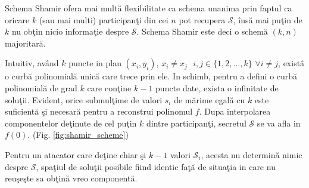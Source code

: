 \documentclass{llncs}
\begin{document}
Schema Shamir ofera mai mult\u{a} flexibilitate ca schema unanima prin faptul ca oricare $k$ (sau mai multi) participan\c{t}i
din cei $n$ pot recupera $\mathcal{S}$, \^{i}ns\u{a} mai pu\c{t}in de $k$ nu ob\c{t}in nicio informa\c{t}ie despre $\mathcal{S}$. Schema Shamir este deci o schem\u{a} $(k,n)$ majoritar\u{a}.

Intuitiv, av\^{a}nd $k$ puncte in plan $(x_i, y_i)$, $x_i \neq x_j \text{ } i,j \in \{1,2,\dots,k\}$ $\forall i \neq j$, exist\^{a} o curb\u{a} polinomial\u{a} unic\u{a} care trece prin ele.  
In schimb, pentru a defini o curb\u{a} polinomial\u{a} de grad $k$ care con\c{t}ine $k - 1$ puncte date, exista o infinitate de solu\c{t}ii.
Evident, orice submul\c{t}ime de valori $s_i$ de m\u{a}rime egal\u{a} cu $k$ este suficient\u{a} \c{s}i necesar\u{a} pentru a reconstrui polinomul $f$. Dupa interpolarea componentelor de\c{t}inute de cel pu\c{t}in $k$ dintre participan\c{t}i, secretul $\mathcal{S}$ se va afla in $f(0)$. (Fig. \ref{fig:shamir_scheme}) 

Pentru un atacator care de\c{t}ine chiar \c{s}i $k-1$ valori $\mathcal{S}_i$, acesta nu determin\u{a} nimic despre $\mathcal{S}$, spa\c{t}iul de solu\c{t}ii posibile fiind identic fa\c{t}\u{a} de situa\c{t}ia in care nu reu\c{s}e\c{s}te sa ob\c{t}in\u{a} vreo component\u{a}.
\end{document}
